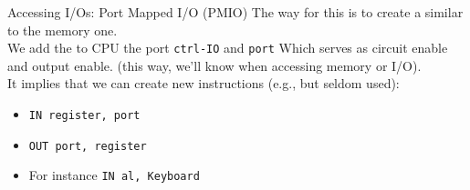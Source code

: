 \begin{parag}{Accessing I/Os: Port Mapped I/O (PMIO)}
    The way for this is to create a  similar to the memory one.\\
	We add the to CPU the port \texttt{ctrl-IO} and \texttt{port} Which serves as circuit enable and output enable. (this way, we'll know when accessing memory or I/O).\\
	It implies that we can create new instructions (e.g.,  but seldom used):
	\begin{itemize}
	    \item \texttt{IN register, port}
		\item \texttt{OUT port, register}
		\item For instance \texttt{IN al, Keyboard}
	\end{itemize}
\end{parag}
